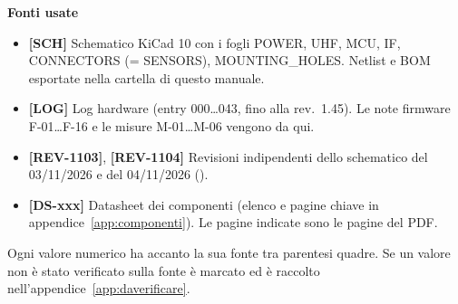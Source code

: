 \vspace{8mm}
{\sffamily\Large\bfseries\color{sbblue} Fonti usate\par}
\vspace{2mm}
\begin{itemize}
\item \textbf{[SCH]} Schematico KiCad 10  con i fogli POWER, UHF, MCU, IF, CONNECTORS (= SENSORS), MOUNTING\_HOLES. Netlist  e BOM  esportate nella cartella di questo manuale.
\item \textbf{[LOG]} Log hardware  (entry 000\ldots043, fino alla rev.\ 1.45). Le note firmware F-01\ldots F-16 e le misure M-01\ldots M-06 vengono da qui.
\item \textbf{[REV-1103]}, \textbf{[REV-1104]} Revisioni indipendenti dello schematico del 03/11/2026 e del 04/11/2026 ().
\item \textbf{[DS-xxx]} Datasheet dei componenti (elenco e pagine chiave in appendice~\ref{app:componenti}). Le pagine indicate sono le pagine del PDF.
\end{itemize}
Ogni valore numerico ha accanto la sua fonte tra parentesi quadre. Se un valore non è stato verificato sulla fonte è marcato \DV{} ed è raccolto nell'appendice~\ref{app:daverificare}.
